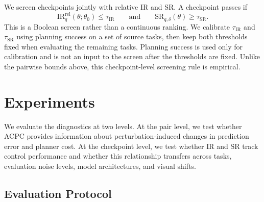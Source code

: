 We screen checkpoints jointly with relative IR and SR. A checkpoint passes if
\[
\mathrm{IR}^{\mathrm{rel}}_{q}(\theta;\theta_0)
\leq \tau_{\mathrm{IR}}
\qquad\text{and}\qquad
\mathrm{SR}_{q,\delta}(\theta)
\geq \tau_{\mathrm{SR}}.
\]
This is a Boolean screen rather than a continuous ranking. We calibrate
$\tau_{\mathrm{IR}}$ and $\tau_{\mathrm{SR}}$ using planning success on a set
of source tasks, then keep both thresholds fixed when evaluating the remaining
tasks. Planning success is used only for calibration and is not an input to
the screen after the thresholds are fixed. Unlike the pairwise bounds above,
this checkpoint-level screening rule is empirical.

\section{Experiments}\label{sec:exp}

We evaluate the diagnostics at two levels. At the pair level, we test whether
ACPC provides information about perturbation-induced changes in prediction
error and planner cost. At the checkpoint level, we test whether IR and SR
track control performance and whether this relationship transfers across tasks,
evaluation noise levels, model architectures, and visual shifts.

\subsection{Evaluation Protocol}\label{sec:bg}




